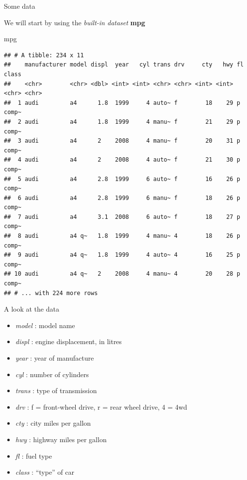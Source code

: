 \documentclass[
  ignorenonframetext,
]{beamer}
\newenvironment{Shaded}{\begin{snugshade}}{\end{snugshade}}
\newcommand{\NormalTok}[1]{#1}
\providecommand{\tightlist}{%
  \setlength{\itemsep}{0pt}\setlength{\parskip}{0pt}}
\begin{document}
\begin{frame}[fragile]{Some data}
\protect\hypertarget{some-data}{}

We will start by using the \emph{built-in dataset} \textbf{mpg}

\begin{Shaded}
\begin{Highlighting}[]
\NormalTok{mpg}
\end{Highlighting}
\end{Shaded}

\begin{verbatim}
## # A tibble: 234 x 11
##    manufacturer model displ  year   cyl trans drv     cty   hwy fl    class
##    <chr>        <chr> <dbl> <int> <int> <chr> <chr> <int> <int> <chr> <chr>
##  1 audi         a4      1.8  1999     4 auto~ f        18    29 p     comp~
##  2 audi         a4      1.8  1999     4 manu~ f        21    29 p     comp~
##  3 audi         a4      2    2008     4 manu~ f        20    31 p     comp~
##  4 audi         a4      2    2008     4 auto~ f        21    30 p     comp~
##  5 audi         a4      2.8  1999     6 auto~ f        16    26 p     comp~
##  6 audi         a4      2.8  1999     6 manu~ f        18    26 p     comp~
##  7 audi         a4      3.1  2008     6 auto~ f        18    27 p     comp~
##  8 audi         a4 q~   1.8  1999     4 manu~ 4        18    26 p     comp~
##  9 audi         a4 q~   1.8  1999     4 auto~ 4        16    25 p     comp~
## 10 audi         a4 q~   2    2008     4 manu~ 4        20    28 p     comp~
## # ... with 224 more rows
\end{verbatim}

\end{frame}

\begin{frame}{A look at the data}
\protect\hypertarget{a-look-at-the-data}{}

\begin{itemize}
\tightlist
\item
  \emph{model} : model name
\item
  \emph{displ} : engine displacement, in litres
\item
  \emph{year} : year of manufacture
\item
  \emph{cyl} : number of cylinders
\item
  \emph{trans} : type of transmission
\item
  \emph{drv} : f = front-wheel drive, r = rear wheel drive, 4 = 4wd
\item
  \emph{cty} : city miles per gallon
\item
  \emph{hwy} : highway miles per gallon
\item
  \emph{fl} : fuel type
\item
  \emph{class} : ``type'' of car
\end{itemize}

\end{frame}
\end{document}
